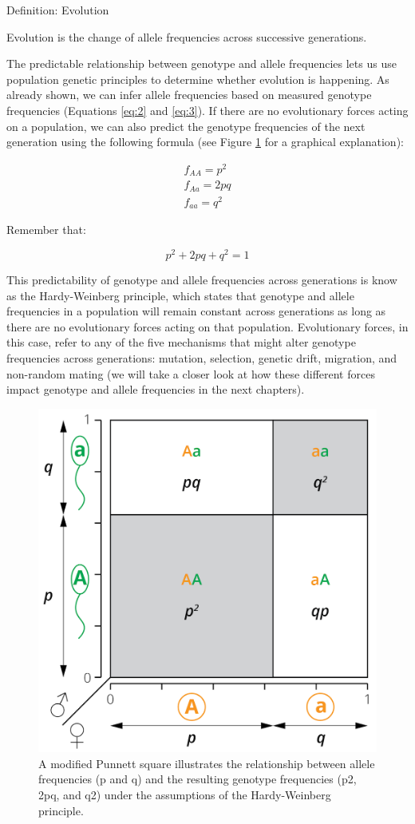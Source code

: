 \documentclass[
]{book}
\begin{document}
Definition: Evolution

Evolution is the change of allele frequencies across successive generations.

The predictable relationship between genotype and allele frequencies lets us use population genetic principles to determine whether evolution is happening. As already shown, we can infer allele frequencies based on measured genotype frequencies (Equations \eqref{eq:2} and \eqref{eq:3}). If there are no evolutionary forces acting on a population, we can also predict the genotype frequencies of the next generation using the following formula (see Figure \ref{fig:punnett} for a graphical explanation):

\begin{align} 
f_{AA}=p^2 \label{eq:4} \\
f_{Aa}=2pq \label{eq:5}\\
f_{aa}=q^2 \label{eq:6}
\end{align}

Remember that:

\begin{equation} 
p^2+2pq+q^2=1 \label{eq:7} 
\end{equation}

This predictability of genotype and allele frequencies across generations is know as the Hardy-Weinberg principle, which states that genotype and allele frequencies in a population will remain constant across generations as long as there are no evolutionary forces acting on that population. Evolutionary forces, in this case, refer to any of the five mechanisms that might alter genotype frequencies across generations: mutation, selection, genetic drift, migration, and non-random mating (we will take a closer look at how these different forces impact genotype and allele frequencies in the next chapters).

\begin{figure}
\includegraphics[width=0.5\linewidth]{images/HWE} \caption{A modified Punnett square illustrates the relationship between allele frequencies (p and q) and the resulting genotype frequencies (p2, 2pq, and q2) under the assumptions of the Hardy-Weinberg principle.}\label{fig:punnett}
\end{figure}
\end{document}
